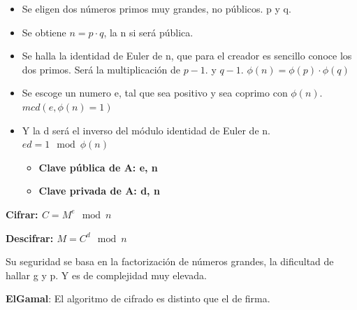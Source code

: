 \documentclass[12pt, twoside, openright]{report} %
\begin{document}
\begin{itemize}
\begin{itemize}
      \begin{itemize}
      \item Se eligen dos números primos muy grandes, no públicos. p y q.
        
      \item Se obtiene $n=p\cdot q$, la n si será pública.
        
      \item Se halla la identidad de Euler de n, que para el creador es
        sencillo conoce los dos primos. Será la multiplicación de $p-1$. y
        $q-1$. $\phi(n) = \phi(p)\cdot\phi(q)$
        
      \item Se escoge un numero e, tal que sea positivo y sea coprimo con
        $\phi (n)$. $mcd(e, \phi(n)=1)$
        
      \item Y la d será el inverso del módulo identidad de Euler de n.
        $ed = 1 \mod \phi (n)$
        

        \begin{itemize}
        \item \textbf{Clave pública de A: e, n}
          
        \item \textbf{Clave privada de A: d, n}
          
        \end{itemize}
      \end{itemize}
    \end{itemize}
  \end{itemize}

  
\textbf{Cifrar: $C=M^e \mod n$}

\textbf{Descifrar: $M=C^d \mod n$}

  
  Su seguridad se basa en la factorización de números grandes, la
  dificultad de hallar g y p. Y es de complejidad muy elevada.
  

  
  \textbf{ElGamal}: El algoritmo de cifrado es distinto que el de firma.
  
\end{document}
